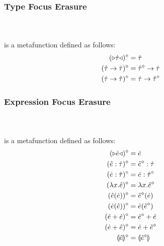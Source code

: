 \documentclass{llncs}
\begin{document}
\subsubsection{Type Focus Erasure}~\\~\\
\noindent\fbox{$\removeSel{\ztau}=\htau$} is a metafunction defined as follows:
\begin{subequations}
\begin{align}
({\triangleright}{\dot{\tau}}{\triangleleft})^{\diamond} & = \dot{\tau}\\
(\hat{\tau} \rightarrow \dot{\tau})^{\diamond} & = \hat{\tau}^{\diamond} \rightarrow \dot{\tau}\\
(\dot{\tau} \rightarrow \hat{\tau})^{\diamond} & = \dot{\tau} \rightarrow \hat{\tau}^{\diamond}
\end{align}
\end{subequations}

\subsubsection{Expression Focus Erasure}~\\~\\
\noindent\fbox{$\removeSel{\zexp}=\hexp$} is a metafunction defined as follows:
\begin{subequations}
\begin{align}
({\triangleright}{\dot{e}}{\triangleleft})^{\diamond} & = \dot{e}\\
(\hat{e} : \dot{\tau})^{\diamond} & = \hat{e}^{\diamond} : \dot{\tau}\\
(\dot{e} : \hat{\tau})^{\diamond} & = \dot{e} : \hat{\tau}^{\diamond}\\
(\lambda x.\hat{e})^{\diamond} & = \lambda x.\hat{e}^{\diamond}\\
(\hat{e}(\dot{e}))^{\diamond} & = \hat{e}^{\diamond}(\dot{e})\\
(\dot{e}(\hat{e}))^{\diamond} & = \dot{e}(\hat{e}^{\diamond})\\
(\hat{e} + \dot{e})^{\diamond} & = \hat{e}^{\diamond} + \dot{e}\\
(\dot{e} + \hat{e})^{\diamond} & = \dot{e} + \hat{e}^{\diamond}\\
\llparenthesis\hat{e}\rrparenthesis^{\diamond} &= \llparenthesis\hat{e}^{\diamond}\rrparenthesis
\end{align}
\end{subequations}
\end{document}
